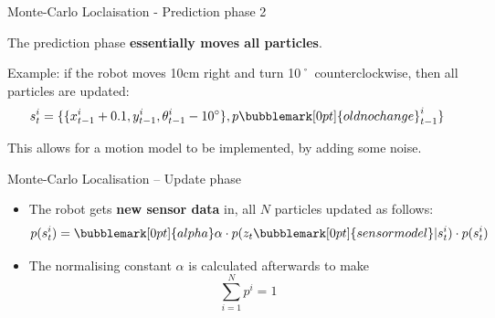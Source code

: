 \documentclass[compress]{beamer}
\begin{document}
\begin{frame}{Monte-Carlo Loclaisation - Prediction phase 2}

The prediction phase \textbf{essentially moves all particles}.

Example: if the robot moves 10cm right and turn 10˚ counterclockwise, then all particles are
updated:
    \Large
    \[
        s_t^i = \{ \{ x_{t-1}^i + 0.1, y_{t-1}^i, \theta_{t-1}^i - 10^{\circ}\}, p\bubblemark[0pt]{oldnochange}_{t-1}^i\}
    \]
    \normalsize

\pause

    This allows for a motion model to be implemented, by adding some noise.




\end{frame}

\begin{frame}{Monte-Carlo Localisation -- Update phase}

    \begin{itemize}
        \item The robot gets \textbf{new sensor data} in, all $N$ particles
            updated as follows:
            \Large
            \[ 
            p(s_t^i) = \bubblemark[0pt]{alpha}\alpha \cdot p(z_t\bubblemark[0pt]{sensormodel}|s_t^i) \cdot p(s_t^i)
            \]
            \normalsize
            \vspace{3em}
        \item The normalising constant $\alpha$ is calculated afterwards to make
            \[ \sum_{i=1}^N p^i = 1 \]
    \end{itemize}



\end{frame}
\end{document}
